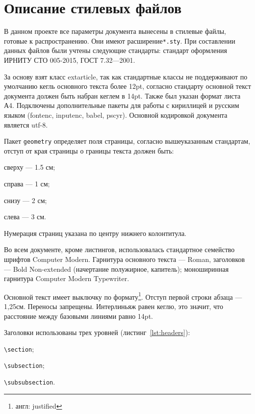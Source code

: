 \section{Описание стилевых файлов}
\label{sec:style}

В данном проекте все параметры документа вынесены в стилевые файлы, готовые к распространению\cite{packages}. Они имеют расширение\texttt{*.sty}. При составлении данных файлов были учтены следующие стандарты: стандарт оформления ИРНИТУ СТО 005-2015\cite{sto005}, ГОСТ 7.32---2001\cite{GOST732}.

За основу взят класс extarticle, так как стандартные классы не поддерживают по умолчанию кегль основного текста более 12pt, согласно стандарту основной текст документа должен быть набран кеглем в 14pt. Также был указан формат листа А4. Подключены дополнительные пакеты для работы с кириллицей и русским языком (fontenc, inputenc, babel, pscyr). Основной кодировкой документа является utf-8.

Пакет \texttt{geometry} определяет поля страницы, согласно вышеуказанным стандартам, отступ от края страницы о границы текста должен быть:
\begin{itemize*}
	\item сверху --- 1.5 см;
	\item справа --- 1 см;
	\item снизу --- 2 см;
	\item слева --- 3 см.
\end{itemize*}

Нумерация страниц указана по центру нижнего колонтитула.

Во всем документе, кроме листингов, использовалась стандартное семейство шрифтов Computer Modern. Гарнитура основного текста --- Roman, заголовков --- Bold Non-extended (начертание полужирное, капитель); моноширинная гарнитура Computer Modern Typewriter.

Основной текст имеет выключку по формату\footnote{англ: justified}. Отступ первой строки абзаца --- 1,25см. Переносы запрещены. Интерлиньяж равен кеглю, это значит, что расстояние между базовыми линиями равно 14pt.

Заголовки использованы трех уровней (листинг~\ref{lst:headers}):

\begin{enumerate*}
	\item \texttt{\textbackslash section};
	\item \texttt{\textbackslash subsection};
	\item \texttt{\textbackslash subsubsection}.
\end{enumerate*}

